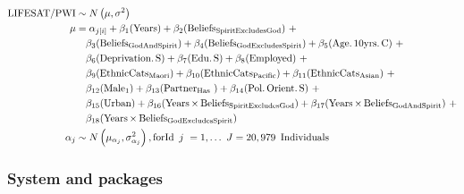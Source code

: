 \documentclass[
  english,
  man]{apa6}
\begin{document}
\[
\begin{aligned}
\operatorname{{\small LIFESAT/PWI}}  &\sim N \left(\mu,\sigma^2 \right) \\ \mu &=\alpha_{j[i]} + \beta_{1}(\operatorname{Years}) + \beta_{2}(\operatorname{Beliefs}_{\operatorname{SpiritExcludesGod}})\ + \\
&\quad \beta_{3}(\operatorname{Beliefs}_{\operatorname{GodAndSpirit}}) + \beta_{4}(\operatorname{Beliefs}_{\operatorname{GodExcludesSpirit}}) + \beta_{5}(\operatorname{Age.10yrs.C})\ + \\
&\quad \beta_{6}(\operatorname{Deprivation.S}) + \beta_{7}(\operatorname{Edu.S}) + \beta_{8}(\operatorname{Employed})\ + \\
&\quad \beta_{9}(\operatorname{EthnicCats}_{\operatorname{Maori}}) + \beta_{10}(\operatorname{EthnicCats}_{\operatorname{Pacific}}) + \beta_{11}(\operatorname{EthnicCats}_{\operatorname{Asian}})\ + \\
&\quad \beta_{12}(\operatorname{Male}_{\operatorname{1}}) + \beta_{13}(\operatorname{Partner}_{\operatorname{Has\ }}) + \beta_{14}(\operatorname{Pol.Orient.S})\ + \\
&\quad \beta_{15}(\operatorname{Urban}) + \beta_{16}(\operatorname{Years} \times \operatorname{Beliefs}_{\operatorname{SpiritExcludesGod}}) + \beta_{17}(\operatorname{Years} \times \operatorname{Beliefs}_{\operatorname{GodAndSpirit}})\ + \\
&\quad \beta_{18}(\operatorname{Years} \times \operatorname{Beliefs}_{\operatorname{GodExcludesSpirit}}) \\ \alpha_{j} &\sim N \left(\mu_{\alpha_{j}},\sigma^2_{\alpha_{j}} \right) , \operatorname{ for  Id }~j~= 1, \dots~J = 20,979~\operatorname{Individuals}
\end{aligned}
\]

\hypertarget{system-and-packages}{%
\subsubsection{System and packages}\label{system-and-packages}}
\end{document}
